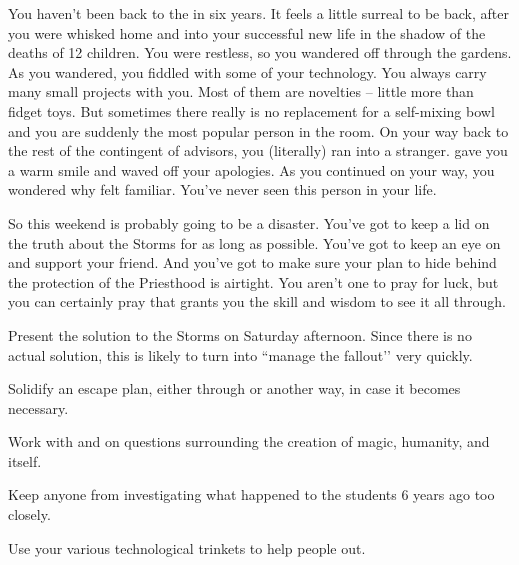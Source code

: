 \documentclass[char]{GL2020}
\begin{document}
You haven’t been back to the \pSc{} in six years. It feels a little surreal to be back, after you were whisked home and into your successful new life in the shadow of the deaths of 12 children. You were restless, so you wandered off through the gardens. As you wandered, you fiddled with some of your technology. You always carry many small projects with you. Most of them are novelties -- little more than fidget toys. But sometimes there really is no replacement for a self-mixing bowl and you are suddenly the most popular person in the room. On your way back to the rest of the \pTech{} contingent of advisors, you (literally) ran into a stranger. \cChupAvenger{\They} gave you a warm smile and waved off your apologies. As you continued on your way, you wondered why \cChupAvenger{\they} felt familiar. You’ve never seen this person in your life.

So this weekend is probably going to be a disaster. You’ve got to keep a lid on the truth about the Storms for as long as possible. You’ve got to keep an eye on \cChupInventor{} and support your friend. And you’ve got to make sure your plan to hide behind the protection of the Priesthood is airtight. You aren’t one to pray for luck, but you can certainly pray that \cTechGod{} grants you the skill and wisdom to see it all through.

\begin{itemz}[Goals]
	\item Present the \pTech{} solution to the Storms on Saturday afternoon. Since there is no actual solution, this is likely to turn into ``manage the fallout’’ very quickly.
	\item Solidify an escape plan, either through \cBeetle{} or another way, in case it becomes necessary.
	\item Work with \cScholarship{} and \cEbbPriest{} on questions surrounding the creation of magic, humanity, and \pEarth{} itself.
	\item Keep anyone from investigating what happened to the students 6 years ago too closely.
	\item Use your various technological trinkets to help people out.
\end{itemz}

\begin{itemz}[Notes]
	\item 
\end{itemz}
\end{document}

